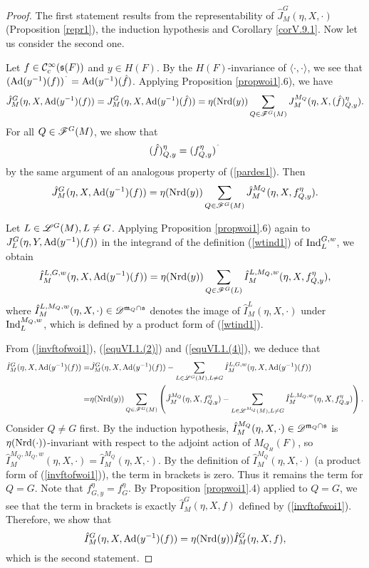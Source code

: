 \documentclass[a4paper]{amsart}
\newcommand{\fm}{{\mathfrak{m}}} \newcommand{\fn}{{\mathfrak{n}}}\newcommand{\fo}{{\mathfrak{o}}} \newcommand{\fp}{{\mathfrak{p}}}
\theoremstyle{definition}
\theoremstyle{remark}
\numberwithin{equation}{subsection}
\begin{document}
\begin{proof}
The first statement results from the representability of $\hat{J}_M^G(\eta, X, \cdot)$ (Proposition \ref{repr1}), the induction hypothesis and Corollary \ref{corV.9.1}. Now let us consider the second one. 

Let $f\in{\mathcal {C}}_c^\infty({\mathfrak{s}}(F))$ and $y\in H(F)$. By the $H(F)$-invariance of $\langle\cdot, \cdot\rangle$, we see that $(\Ad(y^{-1})(f))^\string^=\Ad(y^{-1})(\hat{f})$. Applying Proposition \ref{propwoi1}.6), we have
$$ \hat{J}_M^G(\eta, X, {\mathrm{Ad}}(y^{-1})(f))=J_M^G(\eta, X, {\mathrm{Ad}}(y^{-1})(\hat{f}))=\eta({\mathrm{Nrd}}(y)) \sum_{Q\in\mathscr{F}^G(M)} J_M^{M_Q}(\eta, X, (\hat{f})_{Q,y}^\eta). $$
For all $Q\in\mathscr{F}^G(M)$, we show that
$$ (\hat{f})_{Q,y}^\eta=(f_{Q,y}^\eta)^\string^ $$
by the same argument of an analogous property of (\ref{pardes1}). Then
\begin{equation}\label{equVI.1.(2)}
 \hat{J}_M^G(\eta, X, {\mathrm{Ad}}(y^{-1})(f))=\eta({\mathrm{Nrd}}(y)) \sum_{Q\in\mathscr{F}^G(M)} \hat{J}_M^{M_Q}(\eta, X, f_{Q,y}^\eta). 
\end{equation}

Let $L\in\mathscr{L}^G(M), L\neq G$. Applying Proposition \ref{propwoi1}.6) again to $J_L^G(\eta, Y, {\mathrm{Ad}}(y^{-1})(f))$ in the integrand of the definition (\ref{wtind1}) of ${\mathrm{Ind}}_L^{G, w}$, we obtain
\begin{equation}\label{equVI.1.(4)}
 \hat{I}_M^{L,G,w}(\eta, X, {\mathrm{Ad}}(y^{-1})(f))=\eta({\mathrm{Nrd}}(y)) \sum_{Q\in\mathscr{F}^G(L)} \hat{I}_M^{L,M_Q,w}(\eta, X, f_{Q,y}^\eta), 
\end{equation}
where $\hat{I}_M^{L,M_Q,w}(\eta, X, \cdot)\in\msd^{\fm_Q\cap\fs}$ denotes the image of $\hat{I}_M^L(\eta, X, \cdot)$ under ${\mathrm{Ind}}_L^{M_Q, w}$, which is defined by a product form of (\ref{wtind1}). 

From (\ref{invftofwoi1}), (\ref{equVI.1.(2)}) and (\ref{equVI.1.(4)}), we deduce that
\[\begin{split}
 \hat{I}_M^G(\eta, X, {\mathrm{Ad}}(y^{-1})(f))=&\hat{J}_M^G(\eta, X, {\mathrm{Ad}}(y^{-1})(f))-\sum_{L\in\mathscr{L}^G(M), L\neq G} \hat{I}_M^{L,G,w}(\eta, X, {\mathrm{Ad}}(y^{-1})(f)) \\
 =&\eta({\mathrm{Nrd}}(y)) \sum_{Q\in\mathscr{F}^G(M)} \left(\hat{J}_M^{M_Q}(\eta, X, f_{Q,y}^\eta)-\sum_{L\in\mathscr{L}^{M_Q}(M), L\neq G}\hat{I}_M^{L,M_Q,w}(\eta, X, f_{Q,y}^\eta)\right). 
\end{split}\]
Consider $Q\neq G$ first. By the induction hypothesis, $\hat{I}_M^{M_Q}(\eta, X, \cdot)\in\msd^{\fm_Q\cap\fs}$ is $\eta({\mathrm{Nrd}}(\cdot))$-invariant with respect to the adjoint action of $M_{Q_H}(F)$, so $\hat{I}_M^{M_Q,M_Q,w}(\eta, X, \cdot)=\hat{I}_M^{M_Q}(\eta, X, \cdot)$. By the definition of $\hat{I}_M^{M_Q}(\eta, X, \cdot)$ (a product form of (\ref{invftofwoi1})), the term in brackets is zero. Thus it remains the term for $Q=G$. Note that $f_{G,y}^\eta=f_G^\eta$. By Proposition \ref{propwoi1}.4) applied to $Q=G$, we see that the term in brackets is exactly $\hat{I}_M^G(\eta, X, f)$ defined by (\ref{invftofwoi1}). Therefore, we show that
$$ \hat{I}_M^G(\eta, X, {\mathrm{Ad}}(y^{-1})(f))=\eta({\mathrm{Nrd}}(y))\hat{I}_M^G(\eta, X, f), $$
which is the second statement. 
\end{proof}
\end{document}
